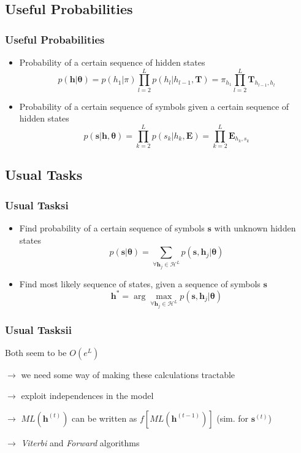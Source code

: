 \documentclass[11pt]{beamer}
\newcommand{\vect}[1]{\boldsymbol{\mathbf{#1}}}
\begin{document}
   \subsection{Useful Probabilities}
   \begin{frame}
       \frametitle{Useful Probabilities}
       \begin{itemize}
           \item Probability of a certain sequence of hidden states
           $$
           p(\vect{h}|\vect{\theta}) = p(h_1|\pi)\prod_{l=2}^L p(h_l|h_{l-1}, \vect{T}) = \pi_{h_1} \prod_{l=2}^L \vect{T}_{h_{l-1},h_l}
           $$
           \item Probability of a certain sequence of symbols given a certain sequence of hidden states
           $$
           p(\vect{s}|\vect{h},\vect{\theta}) = \prod_{k=2}^L p(s_k|h_k, \vect{E}) = \prod_{k=2}^L \vect{E}_{h_k,s_k}
           $$
        \end{itemize}
    \end{frame}
    
   \subsection{Usual Tasks}
   \begin{frame}
       \frametitle{Usual Tasks\quad i}
       \begin{itemize}
           \item Find probability of a certain sequence of symbols $\vect{s}$ with unknown hidden states
           $$
           p(\vect{s}|\vect{\theta}) = \sum_{\forall \vect{h}_j \in \mathcal{H}^L}p(\vect{s},\vect{h}_j|\vect{\theta})
           $$
           \item Find most likely sequence of states, given a sequence of symbols $\vect{s}$
           $$
           \vect{h}^* = \arg \max_{\forall \vect{h}_j \in \mathcal{H}^L} p(\vect{s},\vect{h}_j|\vect{\theta})
           $$
        \end{itemize}
    \end{frame}

   \begin{frame}
       \frametitle{Usual Tasks\quad ii}
           Both seem to be $O(e^L)$
           
           $\rightarrow$ we need some way of making these calculations tractable

           $\rightarrow$ exploit independences in the model

           $\rightarrow$ $ML(\vect{h}^{(t)})$ can be written as $f\left[ML(\vect{h}^{(t-1)})\right]$ (sim. for $\vect{s}^{(t)}$)

           $\rightarrow$ \emph{Viterbi} and \emph{Forward} algorithms
    \end{frame}
    
\end{document}
